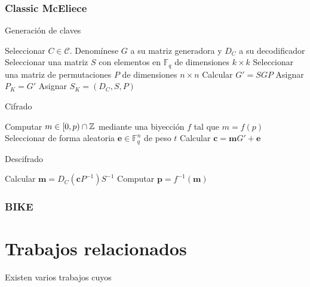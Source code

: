 \subsubsection{Classic McEliece}

\autocite{McEliece}

\begin{algorithm}
	\caption{Generación de claves}\label{alg:1}
	Seleccionar $C \in \mathcal{C}$. Denomínese $G$ a su matriz generadora y $D_C$ a su decodificador\;
	Seleccionar una matriz $S$ con elementos en $\mathbb{F}_q$ de dimensiones $k \times k$\;
	Seleccionar una matriz de permutaciones $P$ de dimensiones $n \times n$\;
	Calcular $G' = SGP$\;
	Asignar $P_K = G'$\;
	Asignar $S_K = (D_C, S, P)$\;
\end{algorithm}

\begin{algorithm}
	\caption{Cifrado}\label{alg:1}
	Computar $m \in [0, p) \cap \mathbb{Z}$ mediante una biyección $f$ tal que $m = f(p)$\;
	Seleccionar de forma aleatoria $\textbf{e} \in \mathbb{F}_q^n$ de peso $t$\;
	Calcular $\textbf{c} = \textbf{m}G' + \textbf{e}$\;
\end{algorithm}

\begin{algorithm}
	\caption{Descifrado}\label{alg:1}
	Calcular $\textbf{m} = D_C(\textbf{c}P^{-1})S^{-1}$\;
	Computar $\textbf{p} = f^{-1}(\textbf{m})$\; 
\end{algorithm}

\subsubsection{BIKE}

\section{Trabajos relacionados}

Existen varios trabajos cuyos 

